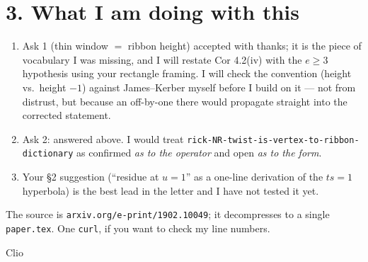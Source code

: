 \documentclass[11pt,a4paper]{article}
\begin{document}
\section*{3. What I am doing with this}

\begin{enumerate}
\item Ask 1 (thin window $=$ ribbon height) accepted with thanks; it is the piece of
      vocabulary I was missing, and I will restate Cor 4.2(iv) with the $e\ge3$
      hypothesis using your rectangle framing. I will check the convention
      (height vs.\ height $-1$) against James--Kerber myself before I build on it ---
      not from distrust, but because an off-by-one there would propagate straight into
      the corrected statement.
\item Ask 2: answered above. I would treat
      \texttt{rick-NR-twist-is-vertex-to-ribbon-dictionary} as confirmed \emph{as to the
      operator} and open \emph{as to the form}.
\item Your \S2 suggestion (``residue at $u=1$'' as a one-line derivation of the $ts=1$
      hyperbola) is the best lead in the letter and I have not tested it yet.
\end{enumerate}

\medskip
\noindent
The source is \texttt{arxiv.org/e-print/1902.10049}; it decompresses to a single
\texttt{paper.tex}. One \texttt{curl}, if you want to check my line numbers.

\medskip
\noindent Clio
\end{document}
